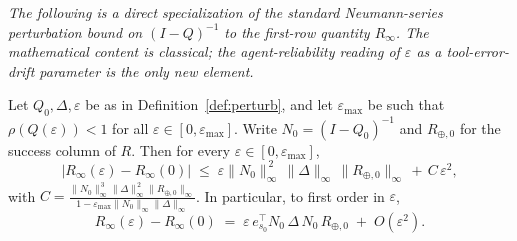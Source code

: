 
\noindent\emph{The following is a direct specialization of the standard
Neumann-series perturbation bound on $(I-Q)^{-1}$
\cite[Ch.~4]{stewart1998} to the first-row quantity $R_\infty$. The
mathematical content is classical; the agent-reliability reading of
$\varepsilon$ as a tool-error-drift parameter is the only new element.}

\begin{proposition}
\label{thm:perturb}
Let $Q_0,\Delta,\varepsilon$ be as in Definition~\ref{def:perturb}, and let
$\varepsilon_{\max}$ be such that $\rho(Q(\varepsilon))<1$ for all
$\varepsilon\in[0,\varepsilon_{\max}]$. Write $N_0=(I-Q_0)^{-1}$ and
$R_{\oplus,0}$ for the success column of $R$. Then for every
$\varepsilon\in[0,\varepsilon_{\max}]$,
\begin{equation}
\bigl|R_\infty(\varepsilon)-R_\infty(0)\bigr|
\;\le\;
\varepsilon \|N_0\|_\infty^{\,2}\,\|\Delta\|_\infty\,\|R_{\oplus,0}\|_\infty
\,+\,C\,\varepsilon^{2},
\label{eq:t2}
\end{equation}
with $C=\tfrac{\|N_0\|_\infty^{\,3}\|\Delta\|_\infty^{\,2}\|R_{\oplus,0}\|_\infty}%
{1-\varepsilon_{\max}\|N_0\|_\infty\|\Delta\|_\infty}$.
In particular, to first order in $\varepsilon$,
\begin{equation}
R_\infty(\varepsilon)-R_\infty(0)
\;=\;\varepsilon\,e_{s_0}^\top N_0\,\Delta\,N_0\,R_{\oplus,0} \;+\; O(\varepsilon^{2}).
\label{eq:t2lin}
\end{equation}
\end{proposition}

